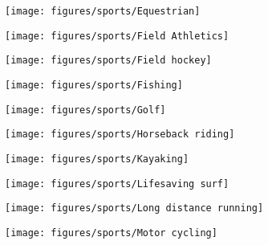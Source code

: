 \documentclass[11pt]{article}
\begin{document}
    \clearpage

    \begin{figure}[htb!]
        \centering

        \begin{subfigure}{.5\textwidth}
            \centering
            \texttt{[image: figures/sports/Equestrian]}
        \end{subfigure}%
        \hfill
        \begin{subfigure}{.5\textwidth}
            \centering
            \texttt{[image: figures/sports/Field Athletics]}
        \end{subfigure}%
        \hfill
        \begin{subfigure}{.5\textwidth}
            \centering
            \texttt{[image: figures/sports/Field hockey]}
        \end{subfigure}%
        \hfill
        \begin{subfigure}{.5\textwidth}
            \centering
            \texttt{[image: figures/sports/Fishing]}
        \end{subfigure}%
        \hfill
        \begin{subfigure}{.5\textwidth}
            \centering
            \texttt{[image: figures/sports/Golf]}
        \end{subfigure}%
        \hfill
        \begin{subfigure}{.5\textwidth}
            \centering
            \texttt{[image: figures/sports/Horseback riding]}
        \end{subfigure}%
        \hfill
        \begin{subfigure}{.5\textwidth}
            \centering
            \texttt{[image: figures/sports/Kayaking]}
        \end{subfigure}%
        \hfill
        \begin{subfigure}{.5\textwidth}
            \centering
            \texttt{[image: figures/sports/Lifesaving surf]}
        \end{subfigure}%
        \hfill
        \begin{subfigure}{.5\textwidth}
            \centering
            \texttt{[image: figures/sports/Long distance running]}
        \end{subfigure}%
        \hfill
        \begin{subfigure}{.5\textwidth}
            \centering
            \texttt{[image: figures/sports/Motor cycling]}
        \end{subfigure}%
    \end{figure}
\end{document}
